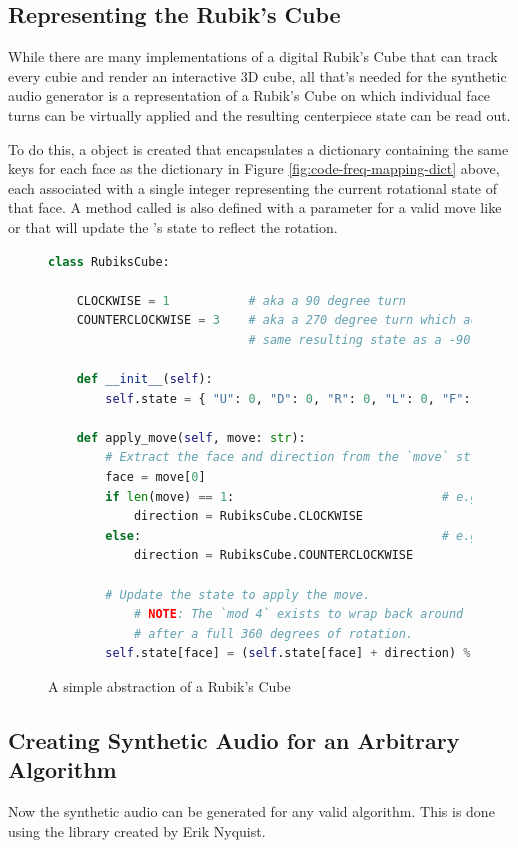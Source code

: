 \newpage
\subsection{Representing the Rubik's Cube}
\label{subsec:represent-rubiks-cube}
While there are many implementations of a digital Rubik's Cube that can track every cubie and render an interactive 3D cube, all that's needed for the synthetic audio generator is a representation of a Rubik's Cube on which individual face turns can be virtually applied and the resulting centerpiece state can be read out.

To do this, a  object is created that encapsulates a dictionary containing the same keys for each face as the  dictionary in Figure \ref{fig:code-freq-mapping-dict} above, each associated with a single integer representing the current rotational state of that face.
A method called  is also defined with a parameter for a valid move like  or  that will update the 's state to reflect the rotation.
\begin{figure}[h]
\caption{A simple abstraction of a Rubik's Cube}
\label{fig:rubiks-cube-code}
\begin{lstlisting}[language=Python]
class RubiksCube:
    
    CLOCKWISE = 1           # aka a 90 degree turn
    COUNTERCLOCKWISE = 3    # aka a 270 degree turn which achieves the
                            # same resulting state as a -90 degree turn

    def __init__(self):
        self.state = { "U": 0, "D": 0, "R": 0, "L": 0, "F": 0, "B": 0 }
    
    def apply_move(self, move: str):
        # Extract the face and direction from the `move` string.
        face = move[0]
        if len(move) == 1:                             # e.g. U
            direction = RubiksCube.CLOCKWISE
        else:                                          # e.g. U'
            direction = RubiksCube.COUNTERCLOCKWISE
        
        # Update the state to apply the move.
            # NOTE: The `mod 4` exists to wrap back around to 0
            # after a full 360 degrees of rotation.
        self.state[face] = (self.state[face] + direction) % 4
\end{lstlisting}
\end{figure}

\subsection{Creating Synthetic Audio for an Arbitrary Algorithm}
\label{subsec:generate-audible-algorithm}
Now the synthetic audio can be generated for any valid algorithm.
This is done using the  library created by Erik Nyquist. \cite{pip-tones}

